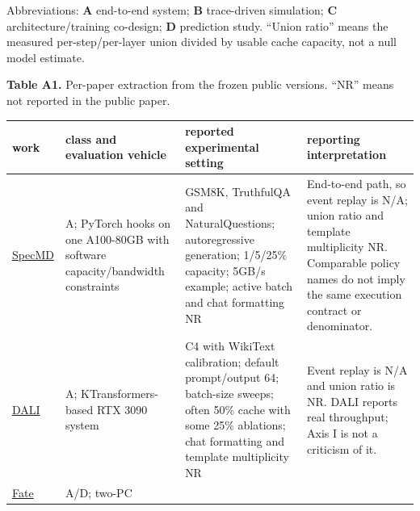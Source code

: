 \documentclass[
  10pt,
  letterpaper,
  10pt]{article}
\newcounter{none} %
\begin{document}
Abbreviations: \textbf{A} end-to-end system; \textbf{B} trace-driven
simulation; \textbf{C} architecture/training co-design; \textbf{D}
prediction study. ``Union ratio'' means the measured per-step/per-layer
union divided by usable cache capacity, not a null model estimate.

\textbf{Table A1.} Per-paper extraction from the frozen public versions.
``NR'' means not reported in the public paper.

{\def\LTcaptype{none} %
\begin{longtable}[]{@{}
  >{\raggedright\arraybackslash}p{}
  >{\raggedright\arraybackslash}p{}
  >{\raggedright\arraybackslash}p{}
  >{\raggedright\arraybackslash}p{}@{}}
\toprule\noalign{}
\begin{minipage}[b]{\linewidth}\raggedright
work
\end{minipage} & \begin{minipage}[b]{\linewidth}\raggedright
class and evaluation vehicle
\end{minipage} & \begin{minipage}[b]{\linewidth}\raggedright
reported experimental setting
\end{minipage} & \begin{minipage}[b]{\linewidth}\raggedright
reporting interpretation
\end{minipage} \\
\midrule\noalign{}
\endhead
\bottomrule\noalign{}
\endlastfoot
\href{https://arxiv.org/abs/2602.03921}{SpecMD} & A; PyTorch hooks on
one A100-80GB with software capacity/bandwidth constraints & GSM8K,
TruthfulQA and NaturalQuestions; autoregressive generation; 1/5/25\%
capacity; 5GB/s example; active batch and chat formatting NR &
End-to-end path, so event replay is N/A; union ratio and template
multiplicity NR. Comparable policy names do not imply the same execution
contract or denominator. \\
\href{https://arxiv.org/abs/2602.03495}{DALI} & A; KTransformers-based
RTX 3090 system & C4 with WikiText calibration; default prompt/output
64; batch-size sweeps; often 50\% cache with some 25\% ablations; chat
formatting and template multiplicity NR & Event replay is N/A and union
ratio is NR. DALI reports real throughput; Axis I is not a criticism of
it. \\
\href{https://arxiv.org/abs/2502.12224}{Fate} & A/D; two-PC

\end{longtable}}
\end{document}
